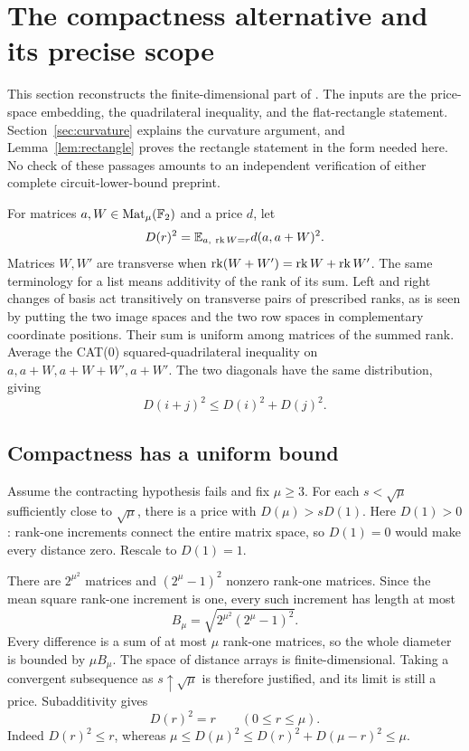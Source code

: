 \section{The compactness alternative and its precise scope}
\label{sec:alternative-audit}

This section reconstructs the finite-dimensional part of
\cite[Theorem D.2, pp.~30--31]{Anthropic2026}.
The inputs are the price-space embedding, the quadrilateral
inequality, and the flat-rectangle statement.
Section~\ref{sec:curvature} explains the curvature argument,
and Lemma~\ref{lem:rectangle} proves the rectangle statement
in the form needed here.
No check of these passages amounts to an independent verification
of either complete circuit-lower-bound preprint.

For matrices $a,W\in\operatorname{Mat}_{\mu}(\mathbb F_2)$ and a price
$d$, let
\[
 D(r)^2=\mathbb E_{a,\ \operatorname{rk} W=r}d(a,a+W)^2.
\]
Matrices $W,W'$ are transverse when
$\operatorname{rk}(W+W')=\operatorname{rk} W+\operatorname{rk} W'$.
The same terminology for a list means additivity of the rank
of its sum.
Left and right changes of basis act transitively on transverse
pairs of prescribed ranks, as is seen by putting the two
image spaces and the two row spaces in complementary
coordinate positions.
Their sum is uniform among matrices of the summed rank.
Average the CAT(0) squared-quadrilateral inequality on
$a,a+W,a+W+W',a+W'$.
The two diagonals have the same distribution, giving
\[
 D(i+j)^2\leq D(i)^2+D(j)^2.
\]

\subsection{Compactness has a uniform bound}

Assume the contracting hypothesis fails and fix $\mu\geq3$.
For each $s<\sqrt\mu$ sufficiently close to $\sqrt\mu$,
there is a price with $D(\mu)>sD(1)$.
Here $D(1)>0$: rank-one increments connect the entire
matrix space, so $D(1)=0$ would make every distance zero.
Rescale to $D(1)=1$.

There are $2^{\mu^2}$ matrices and $(2^\mu-1)^2$ nonzero
rank-one matrices. Since the mean square rank-one increment
is one, every such increment has length at most
\[
 B_\mu=\sqrt{2^{\mu^2}(2^\mu-1)^2}.
\]
Every difference is a sum of at most $\mu$ rank-one matrices,
so the whole diameter is bounded by $\mu B_\mu$.
The space of distance arrays is finite-dimensional.
Taking a convergent subsequence as $s\uparrow\sqrt\mu$ is
therefore justified, and its limit is still a price.
Subadditivity gives
\[
 D(r)^2=r \qquad(0\leq r\leq\mu).
\]
Indeed $D(r)^2\leq r$, whereas
$\mu\leq D(\mu)^2\leq D(r)^2+D(\mu-r)^2\leq\mu$.

